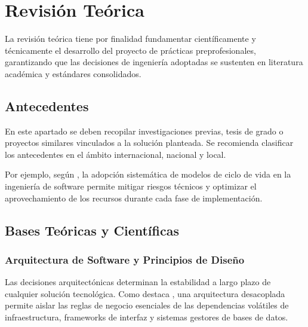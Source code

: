
\section{Revisión Teórica}

La revisión teórica tiene por finalidad fundamentar científicamente y técnicamente el desarrollo del proyecto de prácticas preprofesionales, garantizando que las decisiones de ingeniería adoptadas se sustenten en literatura académica y estándares consolidados.

\subsection{Antecedentes}

En este apartado se deben recopilar investigaciones previas, tesis de grado o proyectos similares vinculados a la solución planteada. Se recomienda clasificar los antecedentes en el ámbito internacional, nacional y local.

Por ejemplo, según \citet{pressman2014}, la adopción sistemática de modelos de ciclo de vida en la ingeniería de software permite mitigar riesgos técnicos y optimizar el aprovechamiento de los recursos durante cada fase de implementación.

\subsection{Bases Teóricas y Científicas}

\subsubsection{Arquitectura de Software y Principios de Diseño}
Las decisiones arquitectónicas determinan la estabilidad a largo plazo de cualquier solución tecnológica. Como destaca \citet{martin2017clean}, una arquitectura desacoplada permite aislar las reglas de negocio esenciales de las dependencias volátiles de infraestructura, frameworks de interfaz y sistemas gestores de bases de datos.

